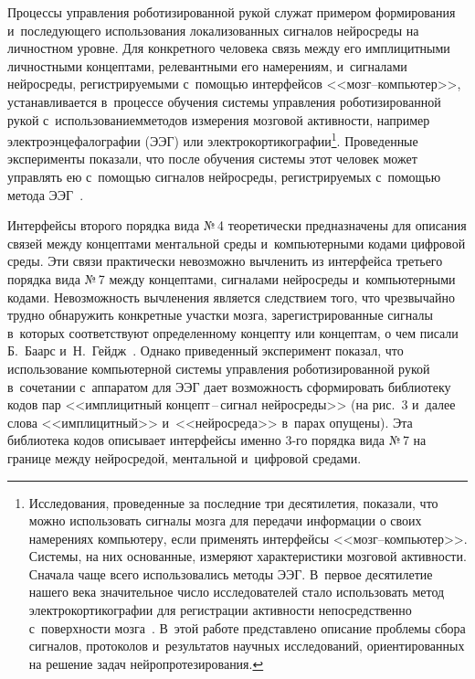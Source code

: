 \begin{multicols}{2}
  Процессы управления роботизированной рукой служат примером 
формирования и~последующего использования локализованных сигналов 
нейросреды на личностном уровне. Для конкретного человека связь между его 
имплицитными личностными концептами, релевантными его намерениям,\linebreak 
и~сигналами нейросреды, регистрируемыми с~по\-мощью интерфейсов  
<<мозг--ком\-пью\-тер>>, уста\-нав\-ли\-ва\-ет\-ся в~процессе обучения системы 
управления роботизированной рукой с~использованием\linebreak методов измерения 
мозговой активности, например электроэнцефалографии (ЭЭГ) или 
электрокортикографии\footnote{Исследования, проведенные за последние три 
десятилетия, показали, что можно использовать сигналы мозга для передачи 
информации о своих намерениях компьютеру, если применять интерфейсы 
<<мозг--ком\-пью\-тер>>. Системы, на них основанные, измеряют 
характеристики мозговой активности. Сначала чаще всего использовались 
методы ЭЭГ. В~первое десятилетие нашего века значительное число 
исследователей стало использовать метод электрокортикографии для 
регистрации активности непосредственно с~поверхности мозга~\cite{23-zat}. 
В~этой работе представлено описание проблемы сбора сигналов, протоколов 
и~результатов научных исследований, ориентированных на решение задач 
нейропротезирования.}. Проведенные эксперименты показали, что после 
обучения системы этот человек может управлять ею с~помощью сигналов 
нейросреды, регистрируемых с~помощью метода ЭЭГ~\cite{22-zat}.
  
  Интерфейсы второго порядка вида №\,4 теоретически предназначены для 
описания связей между концептами ментальной среды и~компьютерными 
кодами цифровой среды. Эти связи практически невозможно вычленить из 
интерфейса третьего порядка вида №\,7 между концептами, сигналами 
нейросреды и~компьютерными кодами. Невозможность вычленения является 
следствием того, что чрезвычайно трудно обнаружить конкретные участки 
мозга, зарегистрированные сигналы в~которых соответствуют определенному 
концепту или концептам, о чем писали Б.~Баарс и~Н.~Гейдж~\cite{18-zat}. 
Однако приведенный эксперимент показал, что использование компьютерной 
системы управления роботизированной рукой в~сочетании с~аппаратом для ЭЭГ 
дает возможность сформировать библиотеку кодов пар <<имплицитный  
кон\-цепт\,--\,сиг\-нал нейросреды>> (на рис.~3 и~далее слова 
<<имплицитный>> и~<<нейросреда>> в~парах опущены). Эта библиотека 
кодов описывает интерфейсы именно 3-го порядка вида №\,7 на границе между 
нейросредой, ментальной и~цифровой средами. 


\end{multicols}
